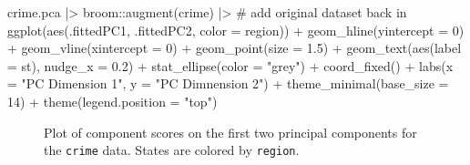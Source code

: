 \documentclass[
  letterpaper,
  10pt,
  krantz2]{krantz}
\makeatletter
\newenvironment{Shaded}{\begin{snugshade}}{\end{snugshade}}
\newcommand{\AttributeTok}[1]{\textcolor[rgb]{0.40,0.45,0.13}{#1}}
\newcommand{\CommentTok}[1]{\textcolor[rgb]{0.37,0.37,0.37}{#1}}
\newcommand{\DecValTok}[1]{\textcolor[rgb]{0.68,0.00,0.00}{#1}}
\newcommand{\FloatTok}[1]{\textcolor[rgb]{0.68,0.00,0.00}{#1}}
\newcommand{\FunctionTok}[1]{\textcolor[rgb]{0.28,0.35,0.67}{#1}}
\newcommand{\NormalTok}[1]{\textcolor[rgb]{0.00,0.23,0.31}{#1}}
\newcommand{\SpecialCharTok}[1]{\textcolor[rgb]{0.37,0.37,0.37}{#1}}
\newcommand{\StringTok}[1]{\textcolor[rgb]{0.13,0.47,0.30}{#1}}
\newenvironment{kframe}{%
  \medskip{}
  \setlength{\fboxsep}{.8em}
  \def\at@end@of@kframe{}%
  \ifinner\ifhmode%
  \def\at@end@of@kframe{\end{minipage}}%
  \begin{minipage}{\columnwidth}%
  \fi\fi%
  \def\FrameCommand##1{\hskip\@totalleftmargin \hskip-\fboxsep
  \colorbox{shadecolor}{##1}\hskip-\fboxsep
      \hskip-\linewidth \hskip-\@totalleftmargin \hskip\columnwidth}%
  \MakeFramed {\advance\hsize-\width
    \@totalleftmargin\z@ \linewidth\hsize
    \@setminipage}}%
{\par\unskip\endMakeFramed%
  \at@end@of@kframe}
\renewenvironment{Shaded}{\begin{kframe}}{\end{kframe}}
\makeatother
\begin{document}
\begin{Shaded}
\begin{Highlighting}[]
\NormalTok{crime.pca }\SpecialCharTok{|\textgreater{}}
\NormalTok{  broom}\SpecialCharTok{::}\FunctionTok{augment}\NormalTok{(crime) }\SpecialCharTok{|\textgreater{}} \CommentTok{\# add original dataset back in}
  \FunctionTok{ggplot}\NormalTok{(}\FunctionTok{aes}\NormalTok{(.fittedPC1, .fittedPC2, }\AttributeTok{color =}\NormalTok{ region)) }\SpecialCharTok{+} 
  \FunctionTok{geom\_hline}\NormalTok{(}\AttributeTok{yintercept =} \DecValTok{0}\NormalTok{) }\SpecialCharTok{+}
  \FunctionTok{geom\_vline}\NormalTok{(}\AttributeTok{xintercept =} \DecValTok{0}\NormalTok{) }\SpecialCharTok{+}
  \FunctionTok{geom\_point}\NormalTok{(}\AttributeTok{size =} \FloatTok{1.5}\NormalTok{) }\SpecialCharTok{+}
  \FunctionTok{geom\_text}\NormalTok{(}\FunctionTok{aes}\NormalTok{(}\AttributeTok{label =}\NormalTok{ st), }\AttributeTok{nudge\_x =} \FloatTok{0.2}\NormalTok{) }\SpecialCharTok{+}
  \FunctionTok{stat\_ellipse}\NormalTok{(}\AttributeTok{color =} \StringTok{"grey"}\NormalTok{) }\SpecialCharTok{+}
  \FunctionTok{coord\_fixed}\NormalTok{() }\SpecialCharTok{+}
  \FunctionTok{labs}\NormalTok{(}\AttributeTok{x =} \StringTok{"PC Dimension 1"}\NormalTok{, }\AttributeTok{y =} \StringTok{"PC Dimnension 2"}\NormalTok{) }\SpecialCharTok{+}
  \FunctionTok{theme\_minimal}\NormalTok{(}\AttributeTok{base\_size =} \DecValTok{14}\NormalTok{) }\SpecialCharTok{+}
  \FunctionTok{theme}\NormalTok{(}\AttributeTok{legend.position =} \StringTok{"top"}\NormalTok{) }
\end{Highlighting}
\end{Shaded}

\begin{figure}[H]


\caption{\label{fig-crime-scores-plot12}Plot of component scores on the
first two principal components for the \texttt{crime} data. States are
colored by \texttt{region}.}

\end{figure}%
\end{document}
